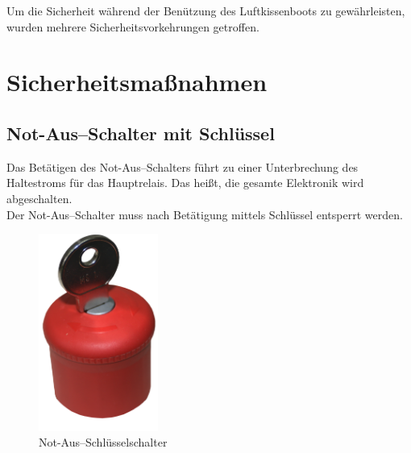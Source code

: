 Um die Sicherheit während der Benützung des Luftkissenboots zu gewährleisten, wurden mehrere Sicherheitsvorkehrungen getroffen. 
\section{Sicherheitsmaßnahmen}
\subsection{Not-Aus--Schalter mit Schlüssel}
Das Betätigen des Not-Aus--Schalters führt zu einer Unterbrechung des Haltestroms für das Hauptrelais. Das heißt, die gesamte Elektronik wird abgeschalten.\\
Der Not-Aus--Schalter muss nach Betätigung mittels Schlüssel entsperrt werden.
\begin{figure}[h]
    \centering
    \includegraphics[width=0.35\textwidth]{Fotos/Notaus.png}
    \caption{Not-Aus--Schlüsselschalter}    
\end{figure}

\clearpage
